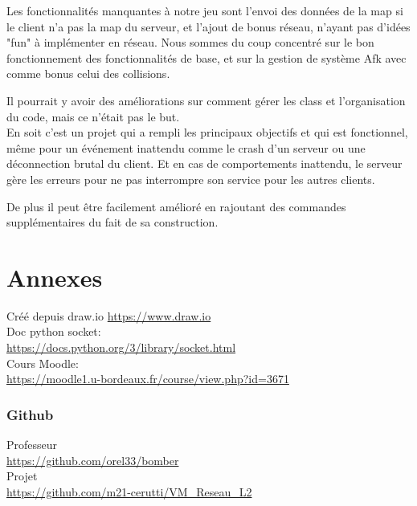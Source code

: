\documentclass[a4paper]{article}
\begin{document}
	Les fonctionnalités manquantes à notre jeu sont l'envoi des données de la map si le client n'a pas la map du serveur, et l'ajout de bonus réseau, n'ayant pas d'idées "fun" à implémenter en réseau. Nous sommes du coup concentré sur le bon fonctionnement des fonctionnalités de base, et sur la gestion de système Afk avec comme bonus celui des collisions. 
	
	Il pourrait y avoir des améliorations sur comment gérer les class et l'organisation du code, mais ce n'était pas le but. 
	\\
	
	En soit c'est un projet qui a rempli les principaux objectifs et qui est fonctionnel, même pour un événement inattendu comme le crash d'un serveur ou une déconnection brutal du client. Et en cas de comportements inattendu, le serveur gère les erreurs pour ne pas interrompre son service pour les autres clients. 
	
	De plus il peut être facilement amélioré en rajoutant des commandes supplémentaires du fait de sa construction.


\newpage
\appendix
\part{Annexes}

\listoffigures

Créé depuis draw.io
\href{https://www.draw.io}{https://www.draw.io}
\\

Doc python socket:\label{docpysoc}
\\
\href{https://docs.python.org/3/library/socket.html}{https://docs.python.org/3/library/socket.html}
\\

Cours Moodle: \label{moodle}
\\
\href{https://moodle1.u-bordeaux.fr/course/view.php?id=3671}{https://moodle1.u-bordeaux.fr/course/view.php?id=3671}

\section{Github} \label{github}

Professeur
\\
\href{https://github.com/orel33/bomber}{https://github.com/orel33/bomber}
\\

Projet
\\
\href{https://github.com/m21-cerutti/VM_Reseau_L2}{https://github.com/m21-cerutti/VM\_Reseau\_L2}
\\
\end{document}
